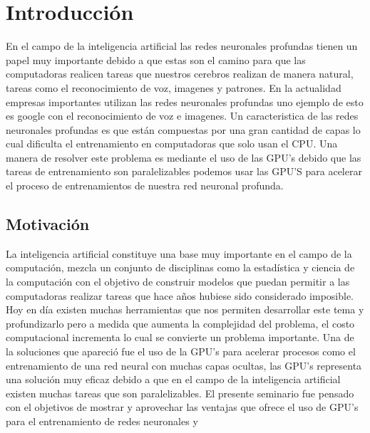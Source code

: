 \chapter{Introducción}
En el campo de la inteligencia artificial las redes neuronales profundas tienen un papel muy importante debido a que estas son el camino para que las computadoras realicen tareas que nuestros cerebros realizan de manera natural, tareas como el reconocimiento de voz, imagenes y patrones. En la actualidad empresas importantes utilizan las redes neuronales profundas uno ejemplo de esto es google con el reconocimiento de voz e imagenes. Un caracteristica de las redes neuronales profundas es que están compuestas por una gran cantidad de capas lo cual dificulta el entrenamiento en computadoras que solo usan el CPU. Una manera de resolver este problema es mediante el uso de las GPU's debido que las tareas de entrenamiento son paralelizables podemos usar las GPU'S para acelerar el proceso de entrenamientos de nuestra red neuronal profunda.

\section{Motivación}
La inteligencia artificial constituye una base muy importante en el campo de la computación, mezcla un conjunto de disciplinas como la estadística y ciencia de la computación con el objetivo de construir modelos que puedan permitir a las computadoras realizar tareas que hace años hubiese sido considerado imposible. Hoy en día existen muchas herramientas que nos permiten desarrollar este tema y profundizarlo pero a medida que aumenta la complejidad del problema, el costo computacional incrementa lo cual se convierte un problema importante. Una de la soluciones que apareció fue el uso de la GPU's para acelerar procesos como el entrenamiento de una red neural con muchas capas ocultas, las GPU's representa una solución muy eficaz debido a que en el campo de la inteligencia artificial existen muchas tareas que son paralelizables.
El presente seminario fue pensado con el objetivos de mostrar y aprovechar las ventajas que ofrece el uso de GPU's para el entrenamiento de redes neuronales y 


